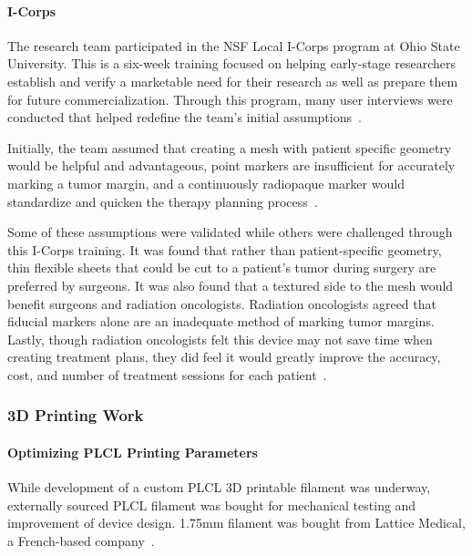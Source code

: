 \paragraph*{I-Corps\label{sec:introduction:priorWork:otherTeamWork:customerDiscovery:iCorps}}

The research team participated in the NSF Local I-Corps program at Ohio State University. This is a six-week training focused on helping early-stage researchers establish and verify a marketable need for their research as well as prepare them for future commercialization. Through this program, many user interviews were conducted that helped redefine the team's initial assumptions~\cite{RefWorks:RefID:386-bakhtarvisualizing}.

Initially, the team assumed that creating a mesh with patient specific geometry would be helpful and advantageous, point markers are insufficient for accurately marking a tumor margin, and a continuously radiopaque marker would standardize and quicken the therapy planning process~\cite{RefWorks:RefID:386-bakhtarvisualizing}.

Some of these assumptions were validated while others were challenged through this I-Corps training. It was found that rather than patient-specific geometry, thin flexible sheets that could be cut to a patient's tumor during surgery are preferred by surgeons. It was also found that a textured side to the mesh would benefit surgeons and radiation oncologists. Radiation oncologists agreed that fiducial markers alone are an inadequate method of marking tumor margins. Lastly, though radiation oncologists felt this device may not save time when creating treatment plans, they did feel it would greatly improve the accuracy, cost, and number of treatment sessions for each patient~\cite{RefWorks:RefID:386-bakhtarvisualizing}.
\subsubsection{3D Printing Work\label{sec:introduction:priorWork:otherTeamWork:3dPrinting}}

\paragraph*{Optimizing PLCL Printing Parameters\label{sec:introduction:priorWork:otherTeamWork:3dPrinting:plclParameters}}

While development of a custom PLCL 3D printable filament was underway, externally sourced PLCL filament was bought for mechanical testing and improvement of device design. 1.75mm filament was bought from Lattice Medical, a French-based company~\cite{RefWorks:RefID:42-latticemedical}.

